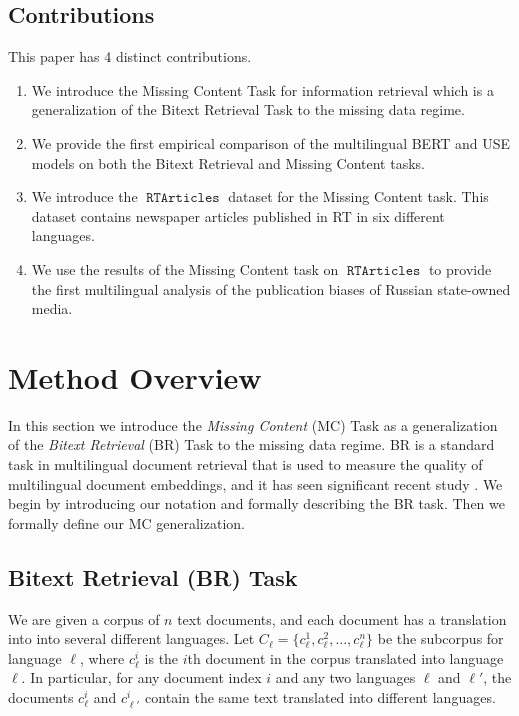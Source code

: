 \documentclass[11pt]{article}
\newcommand{\defn}[1]{\emph{{#1}}}
\DeclareMathOperator{\dataset}{\texttt{RTArticles}}
\begin{document}
\subsection{Contributions}

This paper has 4 distinct contributions.

\begin{enumerate}
    \item 
        We introduce the Missing Content Task for information retrieval which is a generalization of the Bitext Retrieval Task to the missing data regime.
    \item 
        We provide the first empirical comparison of the multilingual BERT and USE models on both the Bitext Retrieval and Missing Content tasks.
    \item 
        We introduce the $\dataset$ dataset for the Missing Content task.
        This dataset contains newspaper articles published in RT in six different languages.
    \item 
        We use the results of the Missing Content task on $\dataset$ to provide the first multilingual analysis of the publication biases of Russian state-owned media.
\end{enumerate}

\section{Method Overview}
\label{sec:method}

In this section we introduce the \defn{Missing Content} (MC) Task as a generalization of the \defn{Bitext Retrieval} (BR) Task to the missing data regime.
BR is a standard task in multilingual document retrieval that is used to measure the quality of multilingual document embeddings, and it has seen significant recent study \cite{}.
We begin by introducing our notation and formally describing the BR task.
Then we formally define our MC generalization.

\subsection{Bitext Retrieval (BR) Task}

We are given a corpus of $n$ text documents,
and each document has a translation into into several different languages.
Let $C_\ell = \{ c_\ell^1, c_\ell^2, ..., c_\ell^{n} \}$ be the subcorpus for language $\ell$,
where $c_\ell^i$ is the $i$th document in the corpus translated into language $\ell$.
In particular, for any document index $i$ and any two languages $\ell$ and $\ell'$,
the documents $c_{\ell}^i$ and $c_{\ell'}^i$ contain the same text translated into different languages.
\end{document}
